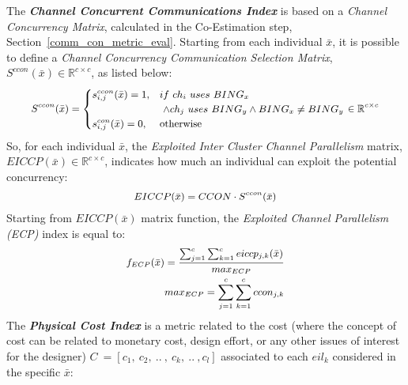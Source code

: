 %
The \textbf{\textit{Channel Concurrent Communications Index}} is based on a \textit{Channel Concurrency Matrix}, calculated in the Co-Estimation step, Section~\ref{comm_con_metric_eval}. Starting from each individual $\bar x$, it is possible to define a \textit{Channel Concurrency Communication Selection Matrix}, $S^{ccon}(\bar x) \in \mathbb{R}^{c \times c}$, as listed below:
%
\begin{equation} \label{eq5_ch}
\small
\begin{aligned}
S^{ccon}(\bar x) = \begin{cases}
    s^{ccon}_{i,j}(\bar x) = 1, & if \ ch_{i} \ {uses} \ BING_{x} \\
    & \ \land ch_{j} \ {uses} \ BING_{y} \land BING_{x} \neq BING_{y}\\
    s^{con}_{i,j}(\bar x) = 0, & \text{otherwise}
\end{cases} \in \mathbb{R}^{c \times c}
\end{aligned}
\end{equation}
%
So, for each individual $\bar x$, the \textit{Exploited Inter Cluster Channel Parallelism} matrix, $EICCP(\bar x) \in \mathbb{R}^{c \times c}$, indicates how much an individual can exploit the potential concurrency:
%
\begin{equation} \label{eq6_ch}
\small
\begin{aligned}
EICCP(\bar x) = CCON \cdot S^{ccon}(\bar x)
\end{aligned}
\end{equation}
%
Starting from $EICCP(\bar x)$ matrix function, the \textit{Exploited Channel Parallelism (ECP)} index is equal to:
%
\begin{equation} \label{eq7_ch}
\small
\begin{aligned}
f_{ECP}(\bar x) &= \frac{\sum^c_{j=1}\sum^c_{k=1}{eiccp_{j,k}}(\bar x)}{max_{ECP}} \\
&max_{ECP} = \sum^c_{j=1}\sum^c_{k=1}ccon_{j,k} 
\end{aligned}
\end{equation}
%
%
%
The \textbf{\textit{Physical Cost Index}} is a metric related to the cost (where the concept of cost can be related to monetary cost, design effort, or any other issues of interest for the designer) $C \ =[c_{1}, \ c_{2}, \ .. \ , \ c_{k}, \ .. \ , c_{l}]$ associated to each \textit{$eil_{k}$} considered in the specific \textit{$\bar x$}:
